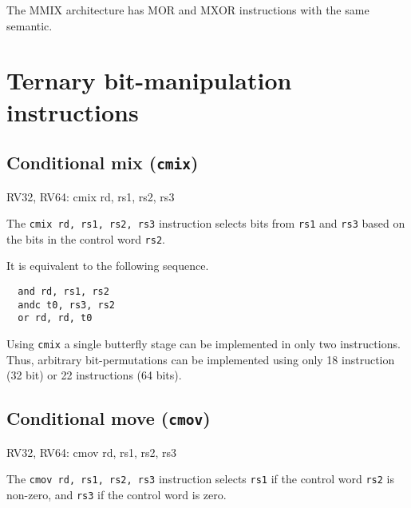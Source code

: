 The MMIX architecture has MOR and MXOR instructions with the same semantic.~\cite[p.~182f]{Knuth4A}




\section{Ternary bit-manipulation instructions}


\subsection{Conditional mix ({\tt cmix})}

\begin{rvb}
  RV32, RV64:
    cmix rd, rs1, rs2, rs3
\end{rvb}

The {\tt cmix rd, rs1, rs2, rs3} instruction selects bits from {\tt rs1} and {\tt rs3} based
on the bits in the control word {\tt rs2}.



It is equivalent to the following sequence.

\begin{minipage}{\linewidth}
\begin{verbatim}
  and rd, rs1, rs2
  andc t0, rs3, rs2
  or rd, rd, t0
\end{verbatim}
\end{minipage}

Using {\tt cmix} a single butterfly stage can be implemented in only two
instructions. Thus, arbitrary bit-permutations can be implemented using only
18 instruction (32 bit) or 22 instructions (64 bits).

\subsection{Conditional move ({\tt cmov})}

\begin{rvb}
  RV32, RV64:
    cmov rd, rs1, rs2, rs3
\end{rvb}

The {\tt cmov rd, rs1, rs2, rs3} instruction selects {\tt rs1} if the control
word {\tt rs2} is non-zero, and {\tt rs3} if the control word is zero.


